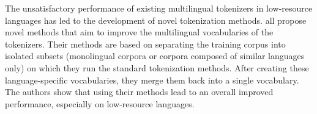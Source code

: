The unsatisfactory performance of existing multilingual tokenizers in low-resource languages has led to the development of novel tokenization methods. \citet{chung_improving_2020,zheng_allocating_2021,liang_xlm-v_2023} all propose novel methods that aim to improve the multilingual vocabularies of the tokenizers. Their methods are based on separating the training corpus into isolated subsets (monolingual corpora or corpora composed of similar languages only) on which they run the standard tokenization methods. After creating these language-specific vocabularies, they merge them back into a single vocabulary. The authors show that using their methods lead to an overall improved performance, especially on low-resource languages.







